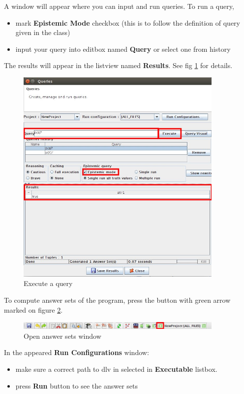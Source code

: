 \documentclass[12pt, letterpaper]{article}
\begin{document}
A window will appear where you can input and run queries.
To run a query, 
\begin{itemize}
\item mark \textbf{Epistemic Mode} checkbox (this is to follow the definition of query given in the class)
\item input your query into editbox named \textbf{Query} or select one from history
\end{itemize}
The results will appear in the listview named \textbf{Results}.
See fig \ref{fig:runquery} for details.
\pagebreak
\begin{figure}[ht]
\centering
\includegraphics[width=0.9\textwidth]{runquery.jpg}
\caption{Execute a query}
\label{fig:runquery}
\end{figure}
\pagebreak

To compute answer sets of the program, press the button with green arrow marked on figure \ref{fig:ansshow}.

\begin{figure}[ht]
\centering
\includegraphics[width=0.9\textwidth]{toolbarans.jpg}
\caption{Open answer sets window}
\label{fig:ansshow}
\end{figure}

In the appeared \textbf{Run Configurations} window: 
\begin{itemize}
\item make sure a correct path to dlv in selected in \textbf{Executable} listbox. 
\item press \textbf{Run} button to see the answer sets
\end{itemize}
\end{document}
